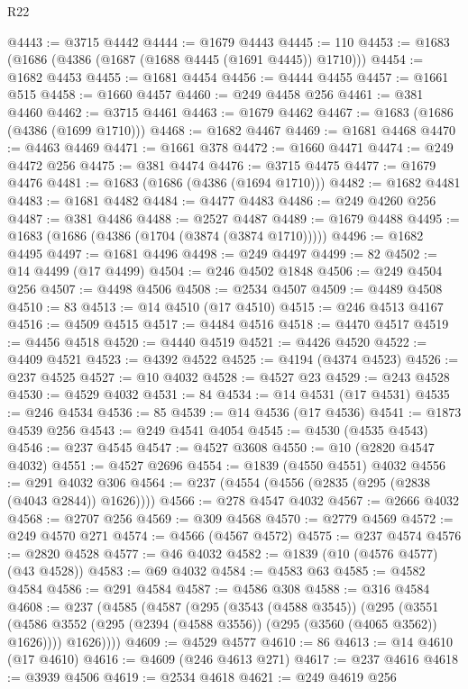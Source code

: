\begin{lexlean}{R22}
\begin{coremodule}
@4443 := @3715 @4442
@4444 := @1679 @4443
@4445 := 110
@4453 := @1683 (@1686 (@4386 (@1687 (@1688 @4445 (@1691 @4445)) @1710)))
@4454 := @1682 @4453
@4455 := @1681 @4454
@4456 := @4444 @4455
@4457 := @1661 @515
@4458 := @1660 @4457
@4460 := @249 @4458 @256
@4461 := @381 @4460
@4462 := @3715 @4461
@4463 := @1679 @4462
@4467 := @1683 (@1686 (@4386 (@1699 @1710)))
@4468 := @1682 @4467
@4469 := @1681 @4468
@4470 := @4463 @4469
@4471 := @1661 @378
@4472 := @1660 @4471
@4474 := @249 @4472 @256
@4475 := @381 @4474
@4476 := @3715 @4475
@4477 := @1679 @4476
@4481 := @1683 (@1686 (@4386 (@1694 @1710)))
@4482 := @1682 @4481
@4483 := @1681 @4482
@4484 := @4477 @4483
@4486 := @249 @4260 @256
@4487 := @381 @4486
@4488 := @2527 @4487
@4489 := @1679 @4488
@4495 := @1683 (@1686 (@4386 (@1704 (@3874 (@3874 @1710)))))
@4496 := @1682 @4495
@4497 := @1681 @4496
@4498 := @249 @4497
@4499 := 82
@4502 := @14 @4499 (@17 @4499)
@4504 := @246 @4502 @1848
@4506 := @249 @4504 @256
@4507 := @4498 @4506
@4508 := @2534 @4507
@4509 := @4489 @4508
@4510 := 83
@4513 := @14 @4510 (@17 @4510)
@4515 := @246 @4513 @4167
@4516 := @4509 @4515
@4517 := @4484 @4516
@4518 := @4470 @4517
@4519 := @4456 @4518
@4520 := @4440 @4519
@4521 := @4426 @4520
@4522 := @4409 @4521
@4523 := @4392 @4522
@4525 := @4194 (@4374 @4523)
@4526 := @237 @4525
@4527 := @10 @4032
@4528 := @4527 @23
@4529 := @243 @4528
@4530 := @4529 @4032
@4531 := 84
@4534 := @14 @4531 (@17 @4531)
@4535 := @246 @4534
@4536 := 85
@4539 := @14 @4536 (@17 @4536)
@4541 := @1873 @4539 @256
@4543 := @249 @4541 @4054
@4545 := @4530 (@4535 @4543)
@4546 := @237 @4545
@4547 := @4527 @3608
@4550 := @10 (@2820 @4547 @4032)
@4551 := @4527 @2696
@4554 := @1839 (@4550 @4551) @4032
@4556 := @291 @4032 @306
@4564 := @237 (@4554 (@4556 (@2835 (@295 (@2838 (@4043 @2844)) @1626))))
@4566 := @278 @4547 @4032
@4567 := @2666 @4032
@4568 := @2707 @256
@4569 := @309 @4568
@4570 := @2779 @4569
@4572 := @249 @4570 @271
@4574 := @4566 (@4567 @4572)
@4575 := @237 @4574
@4576 := @2820 @4528
@4577 := @46 @4032
@4582 := @1839 (@10 (@4576 @4577) (@43 @4528))
@4583 := @69 @4032
@4584 := @4583 @63
@4585 := @4582 @4584
@4586 := @291 @4584
@4587 := @4586 @308
@4588 := @316 @4584
@4608 := @237
    (@4585
      (@4587
        (@295
          (@3543 (@4588 @3545))
          (@295
            (@3551 (@4586 @3552 (@295 (@2394 (@4588 @3556)) (@295 (@3560 (@4065 @3562)) @1626))))
            @1626))))
@4609 := @4529 @4577
@4610 := 86
@4613 := @14 @4610 (@17 @4610)
@4616 := @4609 (@246 @4613 @271)
@4617 := @237 @4616
@4618 := @3939 @4506
@4619 := @2534 @4618
@4621 := @249 @4619 @256

\end{coremodule}
\end{lexlean}
